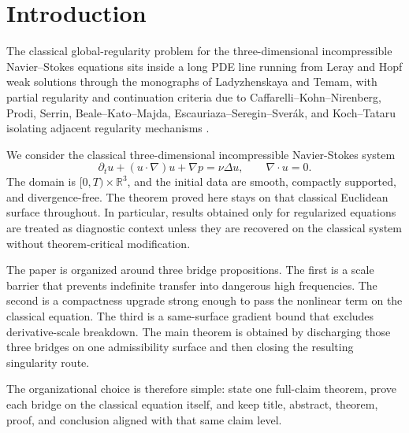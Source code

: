 \section{Introduction}

The classical global-regularity problem for the three-dimensional incompressible Navier--Stokes equations sits inside a long PDE line running from Leray and Hopf weak solutions through the monographs of Ladyzhenskaya and Temam, with partial regularity and continuation criteria due to Caffarelli--Kohn--Nirenberg, Prodi, Serrin, Beale--Kato--Majda, Escauriaza--Seregin--Sver\'ak, and Koch--Tataru isolating adjacent regularity mechanisms \cite{Leray1934,Hopf1951,Ladyzhenskaya1969,Temam2001,CaffarelliKohnNirenberg1982,Prodi1959,Serrin1962,BealeKatoMajda1984,EscauriazaSereginSverak2003,KochTataru2001}.

We consider the classical three-dimensional incompressible Navier-Stokes system
\begin{equation}
\partial_t u + (u\cdot\nabla)u + \nabla p = \nu\Delta u,\qquad \nabla\cdot u = 0.
\end{equation}
The domain is \([0,T)\times\mathbb{R}^3\), and the initial data are smooth, compactly supported, and divergence-free. The theorem proved here stays on that classical Euclidean surface throughout. In particular, results obtained only for regularized equations are treated as diagnostic context unless they are recovered on the classical system without theorem-critical modification.

The paper is organized around three bridge propositions. The first is a scale barrier that prevents indefinite transfer into dangerous high frequencies. The second is a compactness upgrade strong enough to pass the nonlinear term on the classical equation. The third is a same-surface gradient bound that excludes derivative-scale breakdown. The main theorem is obtained by discharging those three bridges on one admissibility surface and then closing the resulting singularity route.

The organizational choice is therefore simple: state one full-claim theorem, prove each bridge on the classical equation itself, and keep title, abstract, theorem, proof, and conclusion aligned with that same claim level.
